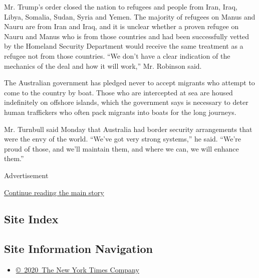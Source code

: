 Mr. Trump's order closed the nation to refugees and people from Iran,
Iraq, Libya, Somalia, Sudan, Syria and Yemen. The majority of refugees
on Manus and Nauru are from Iran and Iraq, and it is unclear whether a
proven refugee on Nauru and Manus who is from those countries and had
been successfully vetted by the Homeland Security Department would
receive the same treatment as a refugee not from those countries. ``We
don't have a clear indication of the mechanics of the deal and how it
will work,'' Mr. Robinson said.

The Australian government has pledged never to accept migrants who
attempt to come to the country by boat. Those who are intercepted at sea
are housed indefinitely on offshore islands, which the government says
is necessary to deter human traffickers who often pack migrants into
boats for the long journeys.

Mr. Turnbull said Monday that Australia had border security arrangements
that were the envy of the world. ``We've got very strong systems,'' he
said. ``We're proud of those, and we'll maintain them, and where we can,
we will enhance them.''

Advertisement

\protect\hyperlink{after-bottom}{Continue reading the main story}

\hypertarget{site-index}{%
\subsection{Site Index}\label{site-index}}

\hypertarget{site-information-navigation}{%
\subsection{Site Information
Navigation}\label{site-information-navigation}}

\begin{itemize}
\tightlist
\item
  \href{https://help.nytimes.com/hc/en-us/articles/115014792127-Copyright-notice}{©~2020~The
  New York Times Company}
\end{itemize}

